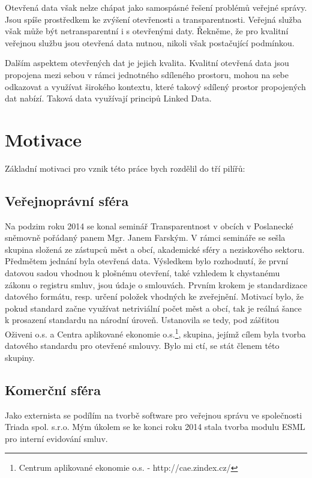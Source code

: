 Otevřená data však nelze chápat jako samospásné řešení problémů veřejné správy. Jsou spíše prostředkem ke zvýšení otevřenosti a transparentnosti. Veřejná služba však může být netransparentní i s otevřenými daty. Řekněme, že pro kvalitní veřejnou službu jsou otevřená data nutnou, nikoli však postačující podmínkou.

Dalším aspektem otevřených dat je jejich kvalita. Kvalitní otevřená data jsou propojena mezi sebou v rámci jednotného sdíleného prostoru, mohou na sebe odkazovat a využívat širokého kontextu, které takový sdílený prostor propojených dat nabízí. Taková data využívají principů Linked Data.

\section{Motivace}

Základní motivaci pro vznik této práce bych rozdělil do tří pilířů:

\subsection*{Veřejnoprávní sféra}

Na podzim roku 2014 se konal seminář Transparentnost v obcích v Poslanecké sněmovně pořádaný panem Mgr. Janem Farským. V rámci semináře se sešla skupina složená ze zástupců měst a obcí, akademické sféry a neziskového sektoru. Předmětem jednání byla otevřená data. Výsledkem bylo rozhodnutí, že první datovou sadou vhodnou k plošnému otevření, také vzhledem k chystanému zákonu o registru smluv, jsou údaje o smlouvách. Prvním krokem je standardizace datového formátu, resp. určení položek vhodných ke zveřejnění. Motivací bylo, že pokud standard začne využívat netriviální počet měst a obcí, tak je reálná šance k prosazení standardu na národní úroveň. Ustanovila se tedy, pod zášťitou Oživeni o.s. a Centra aplikované ekonomie o.s.\footnote{Centrum aplikované ekonomie o.s. - http://cae.zindex.cz/},  skupina, jejímž cílem byla tvorba datového standardu pro otevřené smlouvy. Bylo mi ctí, se stát členem této skupiny.

\subsection*{Komerční sféra}

Jako externista se podílím na tvorbě software pro veřejnou správu ve společnosti Triada spol. s.r.o. Mým úkolem se ke konci roku 2014 stala tvorba modulu ESML pro interní evidování smluv.

